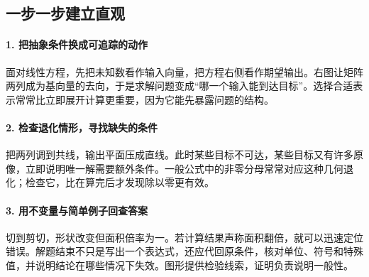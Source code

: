 \subsection*{一步一步建立直观}

\paragraph{1. 把抽象条件换成可追踪的动作}

面对线性方程，先把未知数看作输入向量，把方程右侧看作期望输出。右图让矩阵两列成为基向量的去向，于是求解问题变成“哪一个输入能到达目标”。选择合适表示常常比立即展开计算更重要，因为它能先暴露问题的结构。



\paragraph{2. 检查退化情形，寻找缺失的条件}

把两列调到共线，输出平面压成直线。此时某些目标不可达，某些目标又有许多原像，立即说明唯一解需要额外条件。一般公式中的非零分母常常对应这种几何退化；检查它，比在算完后才发现除以零更有效。



\paragraph{3. 用不变量与简单例子回查答案}

切到剪切，形状改变但面积倍率为一。若计算结果声称面积翻倍，就可以迅速定位错误。解题结束不只是写出一个表达式，还应代回原条件，核对单位、符号和特殊值，并说明结论在哪些情况下失效。图形提供检验线索，证明负责说明一般性。
